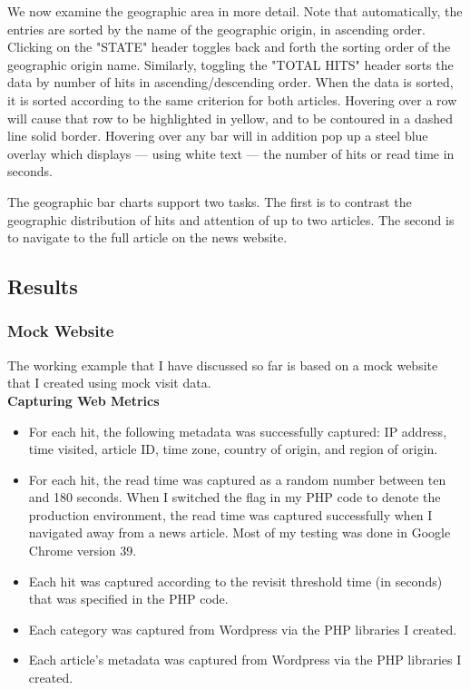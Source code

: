 \documentclass[12pt]{article}
\begin{document}
{\noindent We now examine the geographic area in more detail. Note that automatically, the entries are sorted by the name of the geographic origin, in ascending order. Clicking on the "STATE" header toggles back and forth the sorting order of the geographic origin name. Similarly, toggling the "TOTAL HITS" header sorts the data by number of hits in ascending/descending order. When the data is sorted, it is sorted according to the same criterion for both articles. Hovering over a row will cause that row to be highlighted in yellow, and to be contoured in a dashed line solid border. Hovering over any bar will in addition pop up a steel blue overlay which displays --- using white text --- the number of hits or read time in seconds.  

\noindent The geographic bar charts support two tasks. The first is to contrast the geographic distribution of hits and attention of up to two articles. The second is to navigate to the full article on the news website. 

\newpage

\subsection{Results}

\subsubsection{Mock Website}
The working example that I have discussed so far is based on a mock website that I created using mock visit data. \\

\noindent\textbf{Capturing Web Metrics}
\begin{itemize}
\item For each hit, the following metadata was successfully captured: IP address, time visited, article ID, time zone, country of origin, and region of origin.
\item For each hit, the read time was captured as a random number between ten and 180 seconds. When I switched the flag in my PHP code to denote the production environment, the read time was captured successfully when I navigated away from a news article. Most of my testing was done in Google Chrome version 39.
\item Each hit was captured according to the revisit threshold time (in seconds) that was specified in the PHP code.
\item Each category was captured from Wordpress via the PHP libraries I created.
\item Each article's metadata was captured from Wordpress via the PHP libraries I created.
\end{itemize}

}
\end{document}
